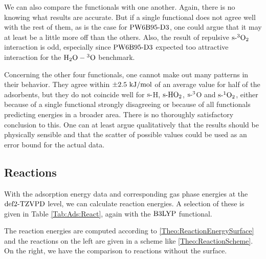 \documentclass[8.5pt,twoside,twocolumn]{article}
\newcommand\sur{\enmat{\te{s-}}}
\newcommand\kmo{\enmat{\te {kJ/mol}}}
\theoremstyle{standard}
\begin{document}
We can also compare the functionals with one another. Again, there is no knowing
what results are accurate. But if a single functional does not agree well with
the rest of them, as is the case for $\text{PW6B95}\text{-D3}$, one could argue that it may
at least be a little more off than the others. Also, the result
of repulsive $\sur^3\ot$ interaction is odd, especially since $\text{PW6B95}\text{-D3}$ 
expected too attractive interaction for the $\mbox{\ensuremath{\text H _2 \text O-\hspace{.2pt} ^3\text{O}}}$ benchmark.

Concerning the other four functionals, one cannot make out many patterns
in their behavior. They agree within $\pm2.5~\kmo$ of an average value
for half of the adsorbents, but they do not coincide well for $\sur$H, $\sur\hot$,
$\sur^3$O and $\sur^1\ot$, either because of a single functional strongly
disagreeing or because of all functionals predicting energies in a broader
area. There is no thoroughly satisfactory conclusion to this. One can
at least argue qualitatively that the results should be physically
sensible and that the scatter of possible values could be used as an error
bound for the actual data.

\subsection{Reactions}
\label{Sec:Ads:Reactions}

With the adsorption energy data and corresponding gas phase energies at the
$\text{def2-TZVPD}$ level, we can calculate reaction energies. A selection of these
is given in Table \ref{Tab:Ads:React}, again with the $\text{B3LYP}$ functional.
 
The reaction energies are computed according to \eqref{Theo:ReactionEnergySurface}
and the reactions on the left are given in a scheme like \eqref{Theo:ReactionScheme}.
On the right, we have the comparison to reactions without the surface.  
\end{document}
